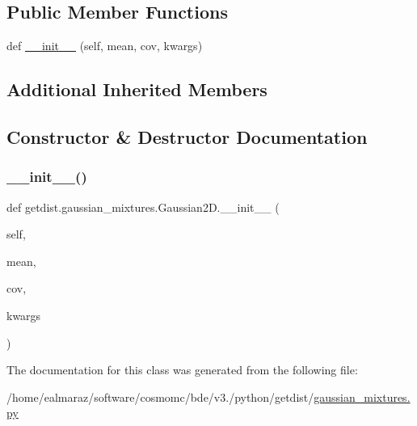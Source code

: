 \subsection*{Public Member Functions}
\begin{DoxyCompactItemize}
\item 
def \mbox{\hyperlink{classgetdist_1_1gaussian__mixtures_1_1Gaussian2D_a4675ac94a2f37f118acd8764997e0dc4}{\+\_\+\+\_\+init\+\_\+\+\_\+}} (self, mean, cov, kwargs)
\end{DoxyCompactItemize}
\subsection*{Additional Inherited Members}


\subsection{Constructor \& Destructor Documentation}
\mbox{\label{classgetdist_1_1gaussian__mixtures_1_1Gaussian2D_a4675ac94a2f37f118acd8764997e0dc4}} 
\subsubsection{\texorpdfstring{\+\_\+\+\_\+init\+\_\+\+\_\+()}{\_\_init\_\_()}}
{\footnotesize\ttfamily def getdist.\+gaussian\+\_\+mixtures.\+Gaussian2\+D.\+\_\+\+\_\+init\+\_\+\+\_\+ (\begin{DoxyParamCaption}\item[{}]{self,  }\item[{}]{mean,  }\item[{}]{cov,  }\item[{}]{kwargs }\end{DoxyParamCaption})}



The documentation for this class was generated from the following file\+:\begin{DoxyCompactItemize}
\item 
/home/ealmaraz/software/cosmomc/bde/v3./python/getdist/\mbox{\hyperlink{gaussian__mixtures_8py}{gaussian\+\_\+mixtures.\+py}}\end{DoxyCompactItemize}
